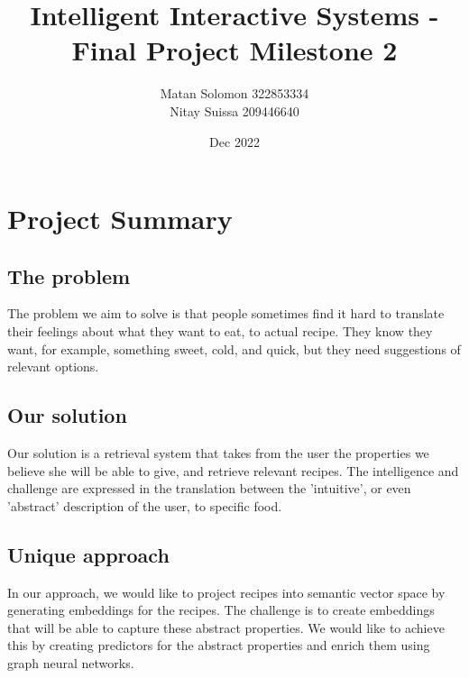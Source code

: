 \documentclass[]{article}
\title{\vspace{-2cm}Intelligent Interactive Systems - Final Project Milestone 2}
\author{Matan Solomon 322853334 \\ Nitay Suissa 209446640}
\date{Dec 2022}
\begin{document}
\maketitle
\section{Project Summary}
\subsection{The problem}
The problem we aim to solve is that people sometimes find it hard to translate their feelings about what they want to eat, to actual recipe. They know they want, for example, something sweet, cold, and quick, but they need suggestions of relevant options.
\subsection{Our solution}
Our solution is a retrieval system that takes from the user the properties we believe she will be able to give, and retrieve relevant recipes. The intelligence and challenge are expressed in the translation between the 'intuitive', or even 'abstract' description of the user, to specific food.
\subsection{Unique approach}
In our approach, we would like to project recipes into semantic vector space by generating embeddings for the recipes. The challenge is to create embeddings that will be able to capture these abstract properties. We would like to achieve this by creating predictors for the abstract properties and enrich them using graph neural networks. 
\end{document}
